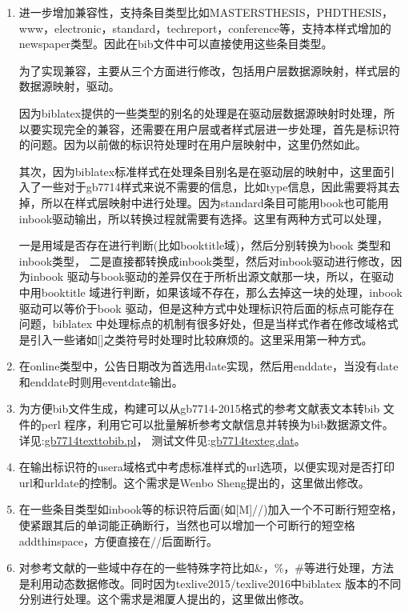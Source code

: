 \label{up:170226}
\begin{enumerate}
\item 进一步增加兼容性，支持条目类型比如MASTERSTHESIS，PHDTHESIS，www，electronic，standard，techreport，conference等，支持本样式增加的newspaper类型。因此在bib文件中可以直接使用这些条目类型。

    为了实现兼容，主要从三个方面进行修改，包括用户层数据源映射，样式层的数据源映射，驱动。

    因为biblatex提供的一些类型的别名的处理是在驱动层数据源映射时处理，所以要实现完全的兼容，还需要在用户层或者样式层进一步处理，首先是标识符的问题。因为以前做的标识符处理时在用户层映射中，这里仍然如此。

    其次，因为biblatex标准样式在处理条目别名是在驱动层的映射中，这里面引入了一些对于gb7714样式来说不需要的信息，比如type信息，因此需要将其去掉，所以在样式层映射中进行处理。因为standard条目可能用book也可能用inbook驱动输出，所以转换过程就需要有选择。这里有两种方式可以处理，

    一是用域是否存在进行判断(比如booktitle域)，然后分别转换为book 类型和inbook类型，
    二是直接都转换成inbook类型，然后对inbook驱动进行修改，因为inbook 驱动与book驱动的差异仅在于所析出源文献那一块，所以，在驱动中用booktitle 域进行判断，如果该域不存在，那么去掉这一块的处理，inbook驱动可以等价于book 驱动，但是这种方式中处理标识符后面的标点可能存在问题，biblatex 中处理标点的机制有很多好处，但是当样式作者在修改域格式是引入一些诸如[]之类符号时处理时比较麻烦的。这里采用第一种方式。

\item 在online类型中，公告日期改为首选用date实现，然后用enddate，当没有date 和enddate时则用eventdate输出。

\item 为方便bib文件生成，构建可以从gb7714-2015格式的参考文献表文本转bib 文件的perl 程序，利用它可以批量解析参考文献信息并转换为bib数据源文件。详见:\href{run:./gb7714texttobib.pl}{gb7714texttobib.pl}，
    测试文件见:\href{run:./gb7714texteg.dat}{gb7714texteg.dat}。

\item 在输出标识符的usera域格式中考虑标准样式的url选项，以便实现对是否打印url和urldate的控制。这个需求是Wenbo Sheng提出的，这里做出修改。

\item 在一些条目类型如inbook等的标识符后面(如[M]//)加入一个不可断行短空格，使紧跟其后的单词能正确断行，当然也可以增加一个可断行的短空格addthinspace，方便直接在//后面断行。
    \begin{texlist}
    \printtext{\texttt{//}\addnbthinspace}%
    \end{texlist}

\item 对参考文献的一些域中存在的一些特殊字符比如\&，\%，\#等进行处理，方法是利用动态数据修改。同时因为texlive2015/texlive2016中biblatex 版本的不同分别进行处理。这个需求是湘厦人提出的，这里做出修改。


\end{enumerate}

